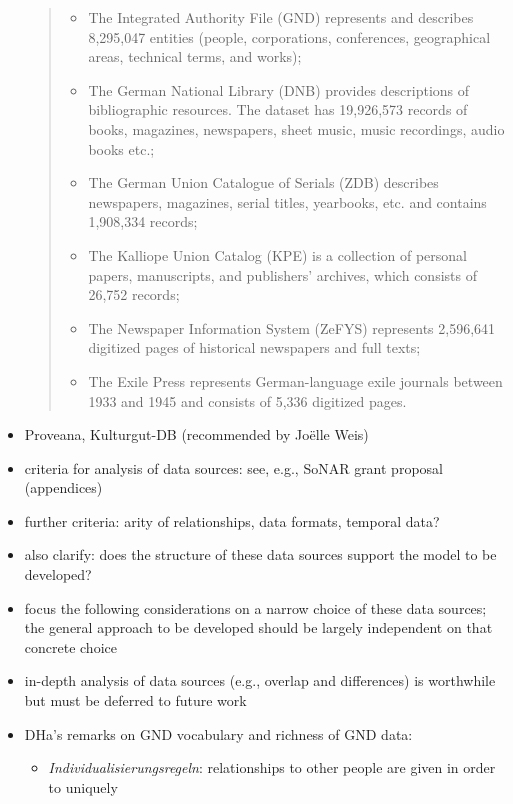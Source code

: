 \begin{itemize}
    \blockquote{%
      \begin{itemize}
        \item
          The Integrated Authority File (GND) represents and describes 8,295,047 entities (people, corporations, conferences, geographical areas, technical terms, and works);
        \item
          The German National Library (DNB) provides descriptions of bibliographic resources. The dataset has 19,926,573 records of books, magazines, newspapers, sheet music, music recordings, audio books etc.;
        \item
          The German Union Catalogue of Serials (ZDB) describes newspapers, magazines, serial titles, yearbooks, etc. and contains 1,908,334 records;
        \item
          The Kalliope Union Catalog (KPE) is a collection of personal papers, manuscripts, and publishers’ archives, which consists of 26,752 records;
        \item
          The Newspaper Information System (ZeFYS) represents 2,596,641 digitized pages of historical newspapers and full texts;
        \item
          The Exile Press represents German-language exile journals between 1933 and 1945 and consists of 5,336 digitized pages.
      \end{itemize}
    }
  \item
    Proveana, Kulturgut-DB (recommended by Jo\"elle Weis)
  \item 
    criteria for analysis of data sources: see, e.g., \gls{SoNAR} grant proposal (appendices) 
  \item
    further criteria: arity of relationships, data formats, temporal data?
  \item
    also clarify: does the structure of these data sources support the model to be developed?
  \item
    focus the following considerations on a narrow choice of these data sources;
    the general approach to be developed should be largely independent on that concrete choice
  \item 
    in-depth analysis of data sources (e.g., overlap and differences) is worthwhile
    but must be deferred to future work
  \item
    DHa's remarks on GND vocabulary and richness of GND data:
    \begin{itemize}
      \item
        \emph{Individualisierungsregeln}: relationships to other people are given in order to uniquely

\end{itemize}
\end{itemize}
